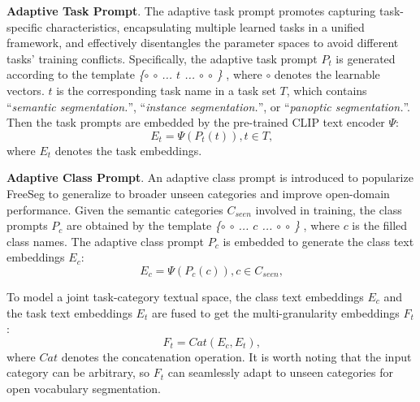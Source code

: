 \documentclass[10pt,twocolumn,letterpaper]{article}
\begin{document}
\textbf{Adaptive Task Prompt}. 
The adaptive task prompt promotes capturing task-specific characteristics, encapsulating multiple learned tasks in a unified framework, and effectively disentangles the parameter spaces to avoid different tasks’ training conflicts.
Specifically, the adaptive task prompt $P_t$ is generated according to the template \textit{\{$\circ$ $\circ$ ... $t$ ... $\circ$ $\circ$ \} }, where $\circ$ denotes the learnable vectors.
$t$ is the corresponding task name in a task set $T$, which contains ``\textit{semantic segmentation.}'', ``\textit{instance segmentation.}'', or ``\textit{panoptic segmentation.}''. Then the task prompts are embedded by the pre-trained CLIP text encoder $\varPsi$:
\begin{equation}
    E_{t} = \varPsi (P_t(t)), t \in T \text{,}
    \end{equation}
where $E_{t}$ denotes the task embeddings.



\textbf{Adaptive Class Prompt}. 
An adaptive class prompt is introduced to popularize FreeSeg to generalize to broader unseen categories and improve open-domain performance.
Given the semantic categories $C_{seen}$ involved in training, the class prompts $P_c$ are obtained by the template \textit{\{$\circ$ $\circ$ ... $c$ ... $\circ$ $\circ$ \} }, where $c$ is the filled class names. 
The adaptive class prompt $P_c$ is embedded to generate the class text embeddings $E_c$:
\begin{equation}
    E_{c} = \varPsi  (P_c(c)), c \in C_{seen} \text{,}
    \end{equation}


To model a joint task-category textual space, the class text embeddings $E_c$ and the task text embeddings $E_t$ are fused to get the multi-granularity embeddings $F_t$:
\begin{equation}
    F_t = Cat(E_{c}, E_{t})   \text{,}
    \end{equation}
where $Cat$ denotes the concatenation operation. 
It is worth noting that the input category can be arbitrary, so $F_t$ can seamlessly adapt to unseen categories for open vocabulary segmentation.
\end{document}
